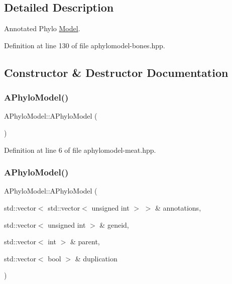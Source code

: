 \subsection{Detailed Description}
Annotated Phylo \hyperlink{class_model}{Model}. 

Definition at line 130 of file aphylomodel-\/bones.\+hpp.



\subsection{Constructor \& Destructor Documentation}
\mbox{\label{class_a_phylo_model_a5055699d05235bbefb283298d9dee75d}} 
\subsubsection{\texorpdfstring{A\+Phylo\+Model()}{APhyloModel()}\hspace{0.1cm}{\footnotesize\ttfamily [1/2]}}
{\footnotesize\ttfamily A\+Phylo\+Model\+::\+A\+Phylo\+Model (\begin{DoxyParamCaption}{ }\end{DoxyParamCaption})}



Definition at line 6 of file aphylomodel-\/meat.\+hpp.

\mbox{\label{class_a_phylo_model_a4c0005c106a12f1b11ccd9f5ceac8d9c}} 
\subsubsection{\texorpdfstring{A\+Phylo\+Model()}{APhyloModel()}\hspace{0.1cm}{\footnotesize\ttfamily [2/2]}}
{\footnotesize\ttfamily A\+Phylo\+Model\+::\+A\+Phylo\+Model (\begin{DoxyParamCaption}\item[{std\+::vector$<$ std\+::vector$<$ unsigned int $>$ $>$ \&}]{annotations,  }\item[{std\+::vector$<$ unsigned int $>$ \&}]{geneid,  }\item[{std\+::vector$<$ int $>$ \&}]{parent,  }\item[{std\+::vector$<$ bool $>$ \&}]{duplication }\end{DoxyParamCaption})}



